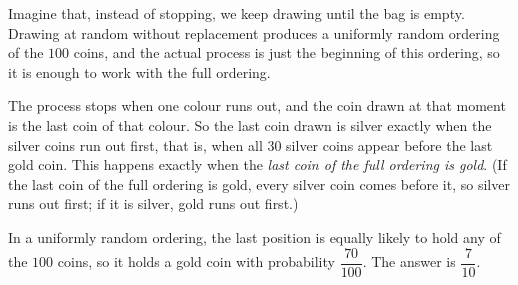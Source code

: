 Imagine that, instead of stopping, we keep drawing until the bag is empty. Drawing at random without replacement produces a uniformly random ordering of the $100$ coins, and the actual process is just the beginning of this ordering, so it is enough to work with the full ordering.

The process stops when one colour runs out, and the coin drawn at that moment is the last coin of that colour. So the last coin drawn is silver exactly when the silver coins run out first, that is, when all $30$ silver coins appear before the last gold coin. This happens exactly when the \emph{last coin of the full ordering is gold}. (If the last coin of the full ordering is gold, every silver coin comes before it, so silver runs out first; if it is silver, gold runs out first.)

In a uniformly random ordering, the last position is equally likely to hold any of the $100$ coins, so it holds a gold coin with probability $\dfrac{70}{100}$. The answer is $\boxed{\dfrac{7}{10}}$.
